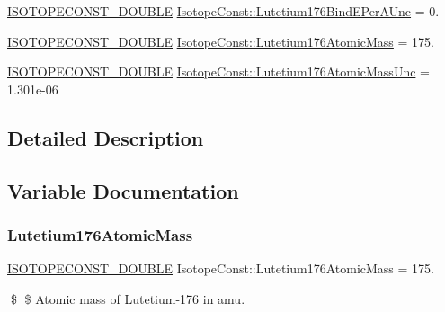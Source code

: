 \begin{DoxyCompactItemize}
\mbox{\hyperlink{group___isotope_const-_macros_ga8f45a7272ce02c0b4c65c44636ed719a}{I\+S\+O\+T\+O\+P\+E\+C\+O\+N\+S\+T\+\_\+\+D\+O\+U\+B\+LE}} \mbox{\hyperlink{group___isotope_const-_lutetium-_lu176_ga92430b7844276ea22097eb1e0c230cdb}{Isotope\+Const\+::\+Lutetium176\+Bind\+E\+Per\+A\+Unc}} = 0.
\item 
\mbox{\hyperlink{group___isotope_const-_macros_ga8f45a7272ce02c0b4c65c44636ed719a}{I\+S\+O\+T\+O\+P\+E\+C\+O\+N\+S\+T\+\_\+\+D\+O\+U\+B\+LE}} \mbox{\hyperlink{group___isotope_const-_lutetium-_lu176_gabc07bdd83514f738a71165db939487d6}{Isotope\+Const\+::\+Lutetium176\+Atomic\+Mass}} = 175.
\item 
\mbox{\hyperlink{group___isotope_const-_macros_ga8f45a7272ce02c0b4c65c44636ed719a}{I\+S\+O\+T\+O\+P\+E\+C\+O\+N\+S\+T\+\_\+\+D\+O\+U\+B\+LE}} \mbox{\hyperlink{group___isotope_const-_lutetium-_lu176_gac4ad1ef7aa385702aa9bf8bb5c088ccf}{Isotope\+Const\+::\+Lutetium176\+Atomic\+Mass\+Unc}} = 1.\+301e-\/06
\end{DoxyCompactItemize}


\subsection{Detailed Description}


\subsection{Variable Documentation}
\mbox{\label{group___isotope_const-_lutetium-_lu176_gabc07bdd83514f738a71165db939487d6}} 
\subsubsection{\texorpdfstring{Lutetium176\+Atomic\+Mass}{Lutetium176AtomicMass}}
{\footnotesize\ttfamily \mbox{\hyperlink{group___isotope_const-_macros_ga8f45a7272ce02c0b4c65c44636ed719a}{I\+S\+O\+T\+O\+P\+E\+C\+O\+N\+S\+T\+\_\+\+D\+O\+U\+B\+LE}} Isotope\+Const\+::\+Lutetium176\+Atomic\+Mass = 175.}

\$ \$ Atomic mass of Lutetium-\/176 in amu. \mbox{\label{group___isotope_const-_lutetium-_lu176_gac4ad1ef7aa385702aa9bf8bb5c088ccf}} 
